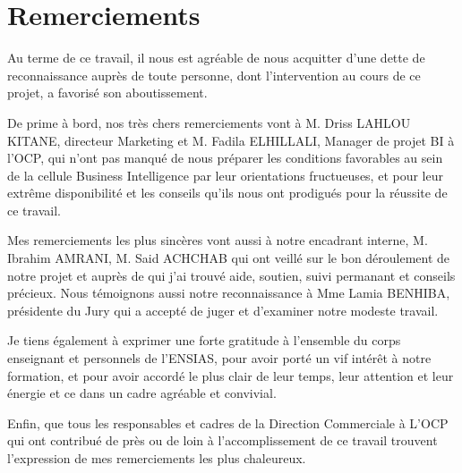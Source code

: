 \chapter*{Remerciements}
Au terme de ce travail, il nous est agréable de nous acquitter d’une dette de reconnaissance
auprès de toute personne, dont l’intervention au cours de ce projet, a favorisé son
aboutissement.
\par
De prime à bord, nos très chers remerciements vont à M. Driss LAHLOU KITANE, directeur
Marketing et M. Fadila ELHILLALI, Manager de projet BI à l’OCP, qui n’ont pas manqué de
nous préparer les conditions favorables au sein de la cellule Business Intelligence par leur
orientations fructueuses, et pour leur extrême disponibilité et les conseils qu’ils nous ont
prodigués pour la réussite de ce travail.
\par
Mes remerciements les plus sincères vont aussi à notre encadrant interne, M. Ibrahim
AMRANI, M. Said ACHCHAB qui ont veillé sur le bon déroulement
de notre projet et auprès de qui j’ai trouvé aide, soutien, suivi permanant et conseils précieux.
Nous témoignons aussi notre reconnaissance à Mme Lamia BENHIBA, présidente du Jury
qui a accepté de juger et d’examiner notre modeste travail.
\par
Je tiens également à exprimer une forte gratitude à l’ensemble du corps enseignant et
personnels de l’ENSIAS, pour avoir porté un vif intérêt à notre formation, et pour avoir accordé
le plus clair de leur temps, leur attention et leur énergie et ce dans un cadre agréable et
convivial.
\par
Enfin, que tous les responsables et cadres de la Direction Commerciale à L’OCP qui ont
contribué de près ou de loin à l’accomplissement de ce travail trouvent l’expression de mes
remerciements les plus chaleureux.